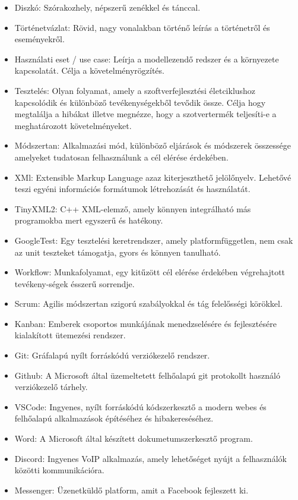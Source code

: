 \documentclass{scrarticle}
\begin{document}
\begin{itemize}
    \item Diszkó: Szórakozhely, népszerű zenékkel és tánccal.
    \item Történetvázlat: Rövid, nagy vonalakban történő leírás a történetről és eseményekről. 
    \item Használati eset / use case: Leírja a modellezendő redszer és a környezete kapcsolatát. Célja a követelményrögzítés.
    \item Tesztelés: Olyan folyamat, amely a szoftverfejlesztési életciklushoz kapcsolódik és különböző tevékenységekből tevődik össze. Célja hogy megtalálja a hibákat illetve megnézze, hogy a szotvertermék teljesíti-e a meghatározott követelményeket.
    \item Módszertan: Alkalmazási mód, különböző eljárások és módszerek összessége amelyeket tudatosan felhasználunk a cél elérése érdekében.
    \item XMl: Extensible Markup Language azaz kiterjeszthető jelölőnyelv. Lehetővé teszi egyéni információs formátumok létrehozását és használatát.
    \item TinyXML2: C++ XML-elemző, amely könnyen integrálható más programokba mert egyszerű és hatékony.
    \item GoogleTest: Egy tesztelési keretrendszer, amely platformfüggetlen, nem csak az unit teszteket támogatja, gyors és könnyen tanulható. 
    \item Workflow: Munkafolyamat, egy kitűzött cél elérése érdekében végrehajtott tevékeny-ségek ésszerű sorrendje. 
    \item Scrum: Agilis módszertan szigorú szabályokkal és tág felelősségi körökkel.
    \item Kanban: Emberek csoportos munkájának menedzselésére és fejlesztésére kialakított ütemezési rendszer.
    \item Git: Gráfalapú nyílt forráskódú verziókezelő rendszer.
    \item Github: A Microsoft által üzemeltetett felhőalapú git protokollt használó verziókezelő tárhely. 
    \item VSCode: Ingyenes, nyílt forráskódú kódszerkesztő a modern webes és felhőalapú alkalmazások építéséhez és hibakereséséhez.
    \item Word: A Microsoft által készített dokumetumszerkesztő program.
    \item Discord: Ingyenes VoIP alkalmazás, amely lehetőséget nyújt a felhasználók közötti kommunikációra.
    \item Messenger: Üzenetküldő platform, amit a Facebook fejleszett ki.  
\end{itemize}
\end{document}
